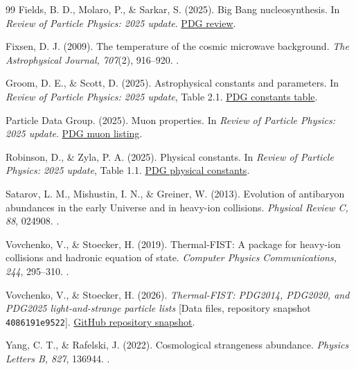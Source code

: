 \begin{thebibliography}{99}\small
\setlength{\itemsep}{2pt}
Fields, B. D., Molaro, P., \& Sarkar, S. (2025).
Big Bang nucleosynthesis. In \emph{Review of Particle Physics: 2025 update}.
\href{https://pdg.lbl.gov/2025/reviews/rpp2025-rev-bbang-nucleosynthesis.pdf}{PDG review}.

Fixsen, D. J. (2009).
The temperature of the cosmic microwave background.
\emph{The Astrophysical Journal, 707}(2), 916--920.
.

Groom, D. E., \& Scott, D. (2025).
Astrophysical constants and parameters. In \emph{Review of Particle Physics: 2025 update}, Table 2.1.
\href{https://pdg.lbl.gov/2025/reviews/rpp2025-rev-astrophysical-constants.pdf}{PDG constants table}.

Particle Data Group. (2025).
Muon properties. In \emph{Review of Particle Physics: 2025 update}.
\href{https://pdg.lbl.gov/2025/listings/rpp2025-list-muon.pdf}{PDG muon listing}.

Robinson, D., \& Zyla, P. A. (2025).
Physical constants. In \emph{Review of Particle Physics: 2025 update}, Table 1.1.
\href{https://pdg.lbl.gov/2025/reviews/rpp2025-rev-phys-constants.pdf}{PDG physical constants}.

Satarov, L. M., Mishustin, I. N., \& Greiner, W. (2013).
Evolution of antibaryon abundances in the early Universe and in heavy-ion collisions.
\emph{Physical Review C, 88}, 024908.
.

Vovchenko, V., \& Stoecker, H. (2019).
Thermal-FIST: A package for heavy-ion collisions and hadronic equation of state.
\emph{Computer Physics Communications, 244}, 295--310.
.

Vovchenko, V., \& Stoecker, H. (2026).
\emph{Thermal-FIST: PDG2014, PDG2020, and PDG2025 light-and-strange particle lists}
[Data files, repository snapshot \texttt{4086191e9522}].
\href{https://github.com/vlvovch/Thermal-FIST/tree/4086191e952285cd572ba2bbbefb2fdc55401c9b/input/list}{GitHub repository snapshot}.

Yang, C. T., \& Rafelski, J. (2022).
Cosmological strangeness abundance.
\emph{Physics Letters B, 827}, 136944.
.

\end{thebibliography}
